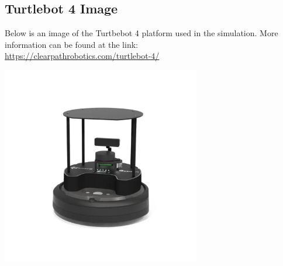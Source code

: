 \newpage

\subsection{Turtlebot 4 Image}
Below is an image of the Turtbebot 4 platform used in the simulation. 
More information can be found at the link: \\
\url{https://clearpathrobotics.com/turtlebot-4/}
\begin{center}
    \includegraphics[width=0.65\textwidth]{figures/tb4.png}
\end{center}


\newpage
